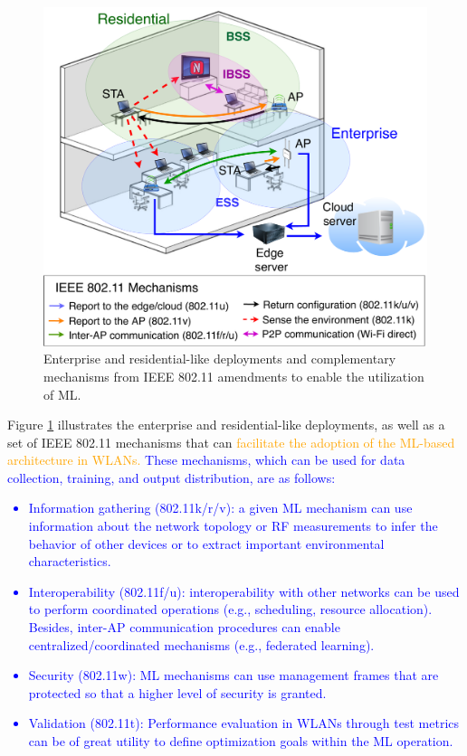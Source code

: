 \documentclass[journal]{IEEEtran}
\begin{document}
\begin{figure}[ht!]
	\centering
	\includegraphics[width=\columnwidth]{overview_learning_approaches}
	\caption{Enterprise and residential-like deployments and complementary mechanisms from IEEE 802.11 amendments to enable the utilization of ML.}
	\label{fig:overview_learning_approaches}
\end{figure}

Figure \ref{fig:overview_learning_approaches} illustrates the enterprise and residential-like deployments, as well as a set of IEEE 802.11 mechanisms that can \textcolor{orange}{facilitate the adoption of the ML-based architecture in WLANs.} \textcolor{blue}{These mechanisms, which can be used for data collection, training, and output distribution, are as follows:}
\textcolor{blue}{\begin{itemize}
	\item Information gathering (802.11k/r/v): a given ML mechanism can use information about the network topology or RF measurements to infer the behavior of other devices or to extract important environmental characteristics.
	\item Interoperability (802.11f/u): interoperability with other networks can be used to perform coordinated operations (e.g., scheduling, resource allocation). Besides, inter-AP communication procedures can enable centralized/coordinated mechanisms (e.g., federated learning).
	\item Security (802.11w): ML mechanisms can use management frames that are protected so that a higher level of security is granted.
	\item Validation (802.11t): Performance evaluation in WLANs through test metrics can be of great utility to define optimization goals within the ML  operation.
\end{itemize}}
\end{document}
